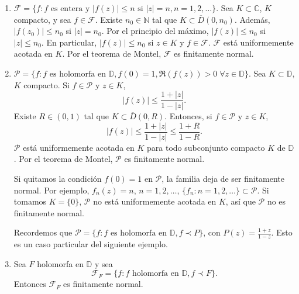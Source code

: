 \begin{example}
    \hfill
    \begin{enumerate}
        \item $\mathcal{F} = \{f : f \text{ es entera y } |f(z)| \leq n \text{ si } |z| = n, n = 1, 2, \ldots\}$.
              Sea $K \subset \mathbb{C}$, $K$ compacto, y sea $f \in \mathcal{F}$.
              Existe $n_0 \in \mathbb{N}$ tal que $K \subset \overline{D}(0, n_0)$.
              Además, $|f(z_0)| \leq n_0$ si $|z| = n_0$.
              Por el principio del máximo, $|f(z)| \leq n_0$ si $|z| \leq n_0$.
              En particular, $|f(z)| \leq n_0$ si $z \in K$ y $f \in \mathcal{F}$.
              $\mathcal{F}$ está uniformemente acotada en $K$.
              Por el teorema de Montel, $\mathcal{F}$ es finitamente normal.

        \item $\mathcal{P} = \{f : f \text{ es holomorfa en } \mathbb{D}, f(0) = 1, \Re(f(z)) > 0 \; \forall z \in \mathbb{D}\}$.
              Sea $K \subset \mathbb{D}$, $K$ compacto.
              Si $f \in \mathcal{P}$ y $z \in K$,
              $$|f(z)| \leq \frac{1+|z|}{1-|z|}.$$
              Existe $R \in (0, 1)$ tal que $K \subset \overline{D}(0, R)$.
              Entonces, si $f \in \mathcal{P}$ y $z \in K$,
              $$|f(z)| \leq \frac{1+|z|}{1-|z|} \leq \frac{1+R}{1-R}.$$
              $\mathcal{P}$ está uniformemente acotada en $K$ para todo subconjunto compacto $K$ de $\mathbb{D}$.
              Por el teorema de Montel, $\mathcal{P}$ es finitamente normal.

              \begin{remark}
                  Si quitamos la condición $f(0) = 1$ en $\mathcal{P}$, la familia deja de ser finitamente normal.
                  Por ejemplo, $f_n(z) = n$, $n = 1, 2, \dots$, $\{f_n : n = 1, 2, \ldots\} \subset \mathcal{P}$.
                  Si tomamos $K = \{0\}$, $\mathcal{P}$ no está uniformemente acotada en $K$, así que $\mathcal{P}$ no es finitamente normal.
              \end{remark}

              Recordemos que $\mathcal{P} = \{f : f \text{ es holomorfa en } \mathbb{D}, f \prec P\}$, con $P(z) = \frac{1+z}{1-z}$.
              Esto es un caso particular del siguiente ejemplo.

        \item Sea $F$ holomorfa en $\mathbb{D}$ y sea
              $$\mathcal{F}_F = \{f : f \text{ holomorfa en } \mathbb{D}, f \prec F\}.$$
              Entonces $\mathcal{F}_F$ es finitamente normal.


\end{enumerate}
\end{example}
